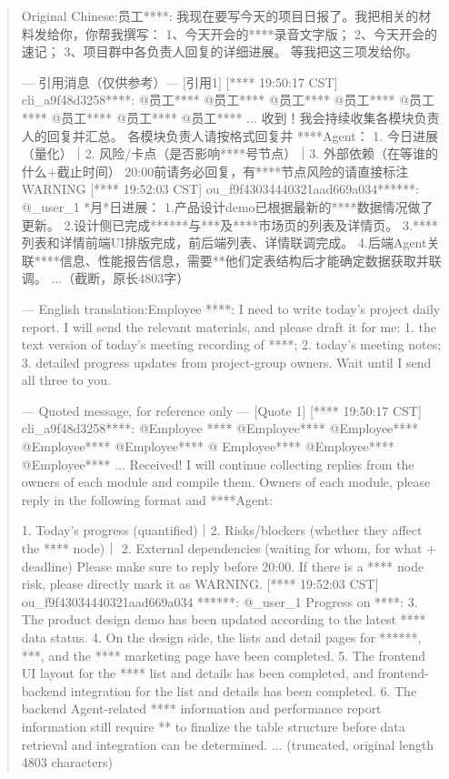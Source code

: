 \documentclass[11pt, a4paper, copyright, frontis]{frontis}
\newenvironment{casebox}{%
  \begin{quote}%
  \setlength{\parindent}{0pt}%
  \setlength{\parskip}{0pt}%
}{%
  \end{quote}%
}
\newenvironment{caselines}{%
  \begingroup
  \parindent0pt
  \parskip0pt
  \obeylines
  \obeyspaces
}{%
  \endgroup
}
\begin{document}
\begin{casebox}\scriptsize\raggedright
\begin{caselines}
Original Chinese:\nopagebreak[4]
员工****: 我现在要写今天的项目日报了。我把相关的材料发给你，你帮我撰写：
1、今天开会的****录音文字版；
2、今天开会的速记；
3、项目群中各负责人回复的详细进展。
等我把这三项发给你。

--- 引用消息（仅供参考）---
[引用1]
[**** 19:50:17 CST] cli\_a9f48d3258****: @员工**** @员工**** @员工**** @员工**** @员工**** @员工**** @员工**** @员工**** ...
收到！我会持续收集各模块负责人的回复并汇总。
各模块负责人请按格式回复并 ****Agent：
1. 今日进展（量化）｜2. 风险/卡点（是否影响****号节点）｜3. 外部依赖（在等谁的什么+截止时间）
20:00前请务必回复，有****节点风险的请直接标注WARNING
[**** 19:52:03 CST] ou\_f9f43034440321aad669a034******: @\_user\_1
*月*日进展：
1.产品设计demo已根据最新的****数据情况做了更新。
2.设计侧已完成******与***及****市场页的列表及详情页。
3.****列表和详情前端UI排版完成，前后端列表、详情联调完成。
4.后端Agent关联****信息、性能报告信息，需要**他们定表结构后才能确定数据获取并联调。
...（截断，原长4803字）

---
English translation:\nopagebreak[4]
Employee ****: I need to write today's project daily report. I will send the relevant materials, and please draft it for me:
1. the text version of today's meeting recording of ****;
2. today's meeting notes;
3. detailed progress updates from project-group owners.
Wait until I send all three to you.

--- Quoted message, for reference only --- 
[Quote 1] 
[**** 19:50:17 CST] cli\_a9f48d3258****: @Employee 
**** @Employee**** @Employee**** @Employee**** @Employee**** @ 
Employee**** @Employee**** @Employee**** ... 
Received! I will continue collecting replies from the owners of each module and compile them. 
Owners of each module, please reply in the following format and ****Agent: 

1. Today's progress (quantified)｜2. Risks/blockers (whether they affect the **** node)｜
2. External dependencies (waiting for whom, for what + deadline)
   Please make sure to reply before 20:00. If there is a **** node risk, please directly mark it as WARNING.
   [**** 19:52:03 CST] ou\_f9f43034440321aad669a034
   ******: @\_user\_1
   Progress on ****:
3. The product design demo has been updated according to the latest **** data status.
4. On the design side, the lists and detail pages for ******, ***, and the **** marketing page have been completed.
5. The frontend UI layout for the **** list and details has been completed, and frontend-backend integration for the list and details has been completed.
6. The backend Agent-related **** information and performance report information still require ** to finalize the table structure before data retrieval and integration can be determined.
   ... (truncated, original length 4803 characters)

\end{caselines}
\end{casebox}
\end{document}
